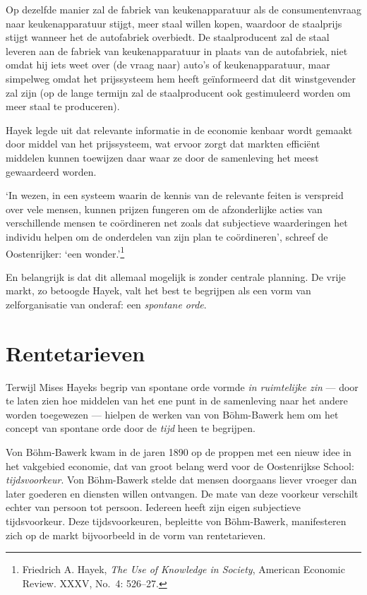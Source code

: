 \documentclass[
  a5paper,
  smalldemyvopaper,11pt,twoside,onecolumn,openright,extrafontsizes,
hidelinks]{memoir}
\begin{document}
Op dezelfde manier zal de fabriek van keukenapparatuur als de
consumentenvraag naar keukenapparatuur stijgt, meer staal willen kopen,
waardoor de staalprijs stijgt wanneer het de autofabriek overbiedt. De
staalproducent zal de staal leveren aan de fabriek van keukenapparatuur
in plaats van de autofabriek, niet omdat hij iets weet over (de vraag
naar) auto's of keukenapparatuur, maar simpelweg omdat het prijssysteem
hem heeft geïnformeerd dat dit winstgevender zal zijn (op de lange
termijn zal de staalproducent ook gestimuleerd worden om meer staal te
produceren).

Hayek legde uit dat relevante informatie in de economie kenbaar wordt
gemaakt door middel van het prijssysteem, wat ervoor zorgt dat markten
efficiënt middelen kunnen toewijzen daar waar ze door de samenleving het
meest gewaardeerd worden.

`In wezen, in een systeem waarin de kennis van de relevante feiten is
verspreid over vele mensen, kunnen prijzen fungeren om de afzonderlijke
acties van verschillende mensen te coördineren net zoals dat subjectieve
waarderingen het individu helpen om de onderdelen van zijn plan te
coördineren', schreef de Oostenrijker: `een wonder.'\footnote{Friedrich
  A. Hayek, \emph{The Use of Knowledge in Society}, American Economic
  Review. XXXV, No.~4: 526--27.}

En belangrijk is dat dit allemaal mogelijk is zonder centrale planning.
De vrije markt, zo betoogde Hayek, valt het best te begrijpen als een
vorm van zelforganisatie van onderaf: een \emph{spontane orde}.

\section{Rentetarieven}\label{rentetarieven}

Terwijl Mises Hayeks begrip van spontane orde vormde \emph{in
ruimtelijke zin} --- door te laten zien hoe middelen van het ene punt in
de samenleving naar het andere worden toegewezen --- hielpen de werken
van von Böhm-Bawerk hem om het concept van spontane orde door de
\emph{tijd} heen te begrijpen.

Von Böhm-Bawerk kwam in de jaren 1890 op de proppen met een nieuw idee
in het vakgebied economie, dat van groot belang werd voor de
Oostenrijkse School: \emph{tijdsvoorkeur}. Von Böhm-Bawerk stelde dat
mensen doorgaans liever vroeger dan later goederen en diensten willen
ontvangen. De mate van deze voorkeur verschilt echter van persoon tot
persoon. Iedereen heeft zijn eigen subjectieve tijdsvoorkeur. Deze tijdsvoorkeuren, bepleitte von Böhm-Bawerk, manifesteren zich op de
markt bijvoorbeeld in de vorm van rentetarieven.
\end{document}
